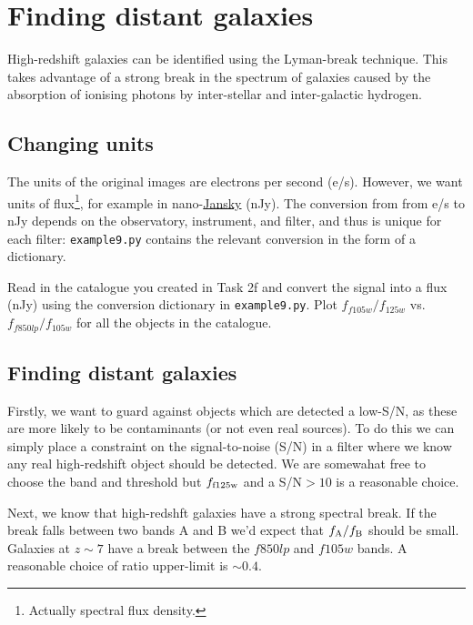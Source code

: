 \documentclass{article}
\begin{document}

\setcounter{Question}{0}
\section{Finding distant galaxies}

High-redshift galaxies can be identified using the Lyman-break technique. This takes advantage of a strong break in the spectrum of galaxies caused by the absorption of ionising photons by inter-stellar and inter-galactic hydrogen.

\subsection{Changing units}

The units of the original images are electrons per second (e/s). However, we want units of flux\footnote{Actually spectral flux density.}, for example in nano-\href{https://en.wikipedia.org/wiki/Jansky}{Jansky} (nJy). The conversion from from e/s to nJy depends on the observatory, instrument, and filter, and thus is unique for each filter: \texttt{example9.py} contains the relevant conversion in the form of a dictionary.

\begin{question}
Read in the catalogue you created in Task 2f and convert the signal into a flux (nJy) using the conversion dictionary in \texttt{example9.py}. Plot $f_{f105w}/f_{125w}$ vs. $f_{f850lp}/f_{105w}$ for all the objects in the catalogue.
\end{question}


\subsection{Finding distant galaxies}


Firstly, we want to guard against objects which are detected a low-S/N, as these are more likely to be contaminants (or not even real sources). To do this we can simply place a constraint on the signal-to-noise (S/N) in a filter where we know any real high-redshift object should be detected. We are somewahat free to choose the band and threshold but $f_{\rm f125w}$ and a S/N$>10$ is a reasonable choice.

Next, we know that high-redshft galaxies have a strong spectral break. If the break falls between two bands A and B we'd expect that $f_{\rm A}/f_{\rm B}$ should be small. Galaxies at $z\sim 7$ have a break between the $f850lp$ and $f105w$ bands. A reasonable choice of ratio upper-limit is $\sim 0.4$.
\end{document}
